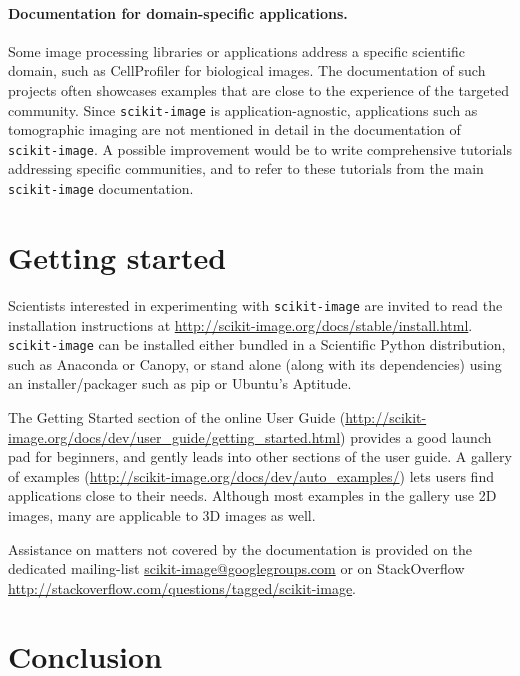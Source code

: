 \documentclass[twocolumn]{bmcart}%
\begin{document}
\paragraph{Documentation for domain-specific applications.} Some image
processing libraries or applications address a specific scientific
domain, such as CellProfiler \citep{Carpenter2006, Lamprecht2007} for
biological images. The documentation of such projects often showcases
examples that are close to the experience of the targeted community.
Since \texttt{scikit-image} is application-agnostic,
applications such as tomographic imaging are not mentioned in detail in the
documentation of \texttt{scikit-image}. A possible improvement would be
to write comprehensive tutorials addressing specific communities, and to
refer to these tutorials from the main \texttt{scikit-image}
documentation.

\section*{Getting started}

Scientists interested in experimenting with \texttt{scikit-image} are
invited to read the installation instructions at
\url{http://scikit-image.org/docs/stable/install.html}.
\texttt{scikit-image} can be installed either bundled in a Scientific
Python distribution, such as Anaconda or Canopy, or stand alone (along with its
dependencies) using an installer/packager such as pip or Ubuntu's
Aptitude.

The Getting Started section of the online User Guide
(\url{http://scikit-image.org/docs/dev/user_guide/getting_started.html})
provides a good launch pad for beginners, and gently leads into other sections of the user
guide. A gallery of examples
(\url{http://scikit-image.org/docs/dev/auto_examples/}) lets users
find applications close to their needs. Although most examples in the
gallery use 2D images, many are applicable to 3D images as well.

Assistance on matters not covered by the documentation is provided on
the dedicated mailing-list \url{scikit-image@googlegroups.com} or on
StackOverflow
\url{http://stackoverflow.com/questions/tagged/scikit-image}.

\section*{Conclusion}
\end{document}
